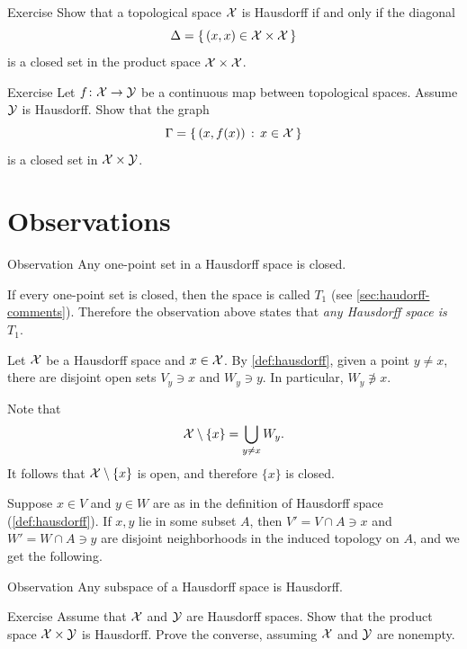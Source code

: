 \begin{thm}{Exercise}\label{ex:hausdorff-diagonal}
Show that a topological space $\mathcal{X}$ is Hausdorff
if and only if the diagonal
\[\Delta=\{\,(x,x)\in \mathcal{X}\times\mathcal{X}\,\}\]
is a closed set in the product space $\mathcal{X}\times\mathcal{X}$.
\end{thm}

\begin{thm}{Exercise}\label{ex:closed-graph-hausdorff}
Let $f\colon\mathcal{X}\to\mathcal{Y}$ be a continuous map between topological spaces.
Assume $\mathcal{Y}$ is Hausdorff.
Show that the graph
\[\Gamma\z=\set{(x,f(x))}{x\in\c{X}}\]
is a closed set in $\mathcal{X}\times\mathcal{Y}$.
\end{thm}


\section{Observations}\label{sec:haus-observations}

\begin{thm}{Observation}\label{obs:one-point=compact}
Any one-point set in a Hausdorff space is closed. 
\end{thm}

If every one-point set is closed, then the space is called \emph{$T_1$} (see \ref{sec:haudorff-comments}).
Therefore the observation above states that \textit{any Hausdorff space is $T_1$}.

Let $\mathcal{X}$ be a Hausdorff space and $x\in \mathcal{X}$.
By \ref{def:hausdorff}, given a point $y\ne x$,
there are disjoint open sets $V_y\ni x$ and $W_y\ni y$.
In particular, $W_y\not\ni x$.

Note that 
\[\mathcal{X}\setminus\{x\}=\bigcup_{y\ne x}W_y.\]
It follows that $\mathcal{X}\setminus\{x\}$ is open, and therefore $\{x\}$ is closed.
\qeds

Suppose $x\in V$ and $y\in W$ are as in the definition of Hausdorff space (\ref{def:hausdorff}).
If $x,y$ lie in some subset $A$, then $V'=V\cap A\ni x$ and $W'=W\cap A\ni y$ are disjoint neighborhoods in the induced topology on $A$, and we get the following.


\begin{thm}{Observation}
Any subspace of a Hausdorff space is Hausdorff.
\end{thm}

\begin{thm}{Exercise}\label{ex:product}
Assume that $\mathcal{X}$ and $\mathcal{Y}$ are Hausdorff spaces.
Show that the product space $\mathcal{X}\times\mathcal{Y}$ is Hausdorff.
Prove the converse, assuming $\mathcal{X}$ and $\mathcal{Y}$ are nonempty.
\end{thm}


